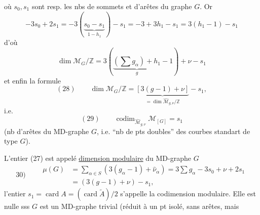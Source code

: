 où $s_0,s_1$ sont resp. les nbs de sommets et d'arêtes du graphe $G$. Or
\[
-3s_0+2s_1=-3(\underbrace{s_0-s_1}_{1-h_1})-s_1=-3+3h_1-s_1=3(h_1-1)-s_1
\]
d'où
\[
\dim\mathcal M_G/\mathbb Z=3(\underbrace{(\sum g_\alpha)+h_1}_{g}-1)+\nu-s_1
\]
et enfin la formule
\[
(28)\qquad\dim\mathcal M_G/\mathbb Z=\underbrace{[3(g-1)+\nu]}_{=\dim\widehat{\mathcal M}_{g,\nu}/\mathbb Z}-s_1,
\]
i.e.
\[
(29)\qquad\operatorname{codim}_{\widehat{\mathcal M}_{g,\nu}}\mathcal M_{[G]}=s_1
\]
(nb d'arêtes du MD-graphe $G$, i.e. ``nb de pts doubles'' des courbes standart de type $G$).

L'entier (27) est appelé \uline{dimension modulaire} du MD-graphe $G$
\[
30)\qquad\begin{aligned}
\mu(G)&=\sum_{\alpha\in S}(3(g_\alpha-1)+\widehat\nu_\alpha)=3\sum g_\alpha-3s_0+\nu+2s_1\\
&=(3(g-1)+\nu)-s_1,
\end{aligned}
\]
l'entier $s_1=\operatorname{card}A=(\operatorname{card}\widetilde A)/2$ s'appelle la codimension modulaire. Elle est nulle sss $G$ est un MD-graphe trivial (réduit à un pt isolé, sans arêtes, mais
